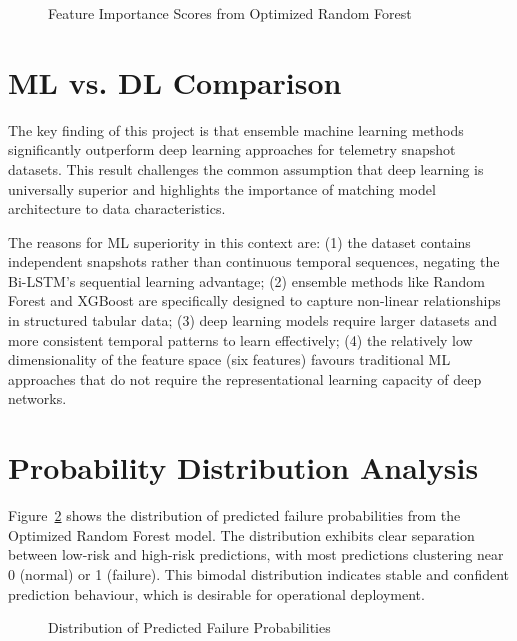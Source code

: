 \documentclass[12pt,letterpaper]{report}
\begin{document}
\begin{figure}[H]
\centering
{}
\caption{Feature Importance Scores from Optimized Random Forest}
\label{fig:feature_importance}
\end{figure}

\section{ML vs. DL Comparison}

The key finding of this project is that ensemble machine learning methods significantly outperform deep learning approaches for telemetry snapshot datasets. This result challenges the common assumption that deep learning is universally superior and highlights the importance of matching model architecture to data characteristics.

The reasons for ML superiority in this context are: (1) the dataset contains independent snapshots rather than continuous temporal sequences, negating the Bi-LSTM's sequential learning advantage; (2) ensemble methods like Random Forest and XGBoost are specifically designed to capture non-linear relationships in structured tabular data; (3) deep learning models require larger datasets and more consistent temporal patterns to learn effectively; (4) the relatively low dimensionality of the feature space (six features) favours traditional ML approaches that do not require the representational learning capacity of deep networks.

\section{Probability Distribution Analysis}

Figure~\ref{fig:prob_dist} shows the distribution of predicted failure probabilities from the Optimized Random Forest model. The distribution exhibits clear separation between low-risk and high-risk predictions, with most predictions clustering near 0 (normal) or 1 (failure). This bimodal distribution indicates stable and confident prediction behaviour, which is desirable for operational deployment.

\begin{figure}[H]
\centering
{}
\caption{Distribution of Predicted Failure Probabilities}
\label{fig:prob_dist}
\end{figure}
\end{document}
